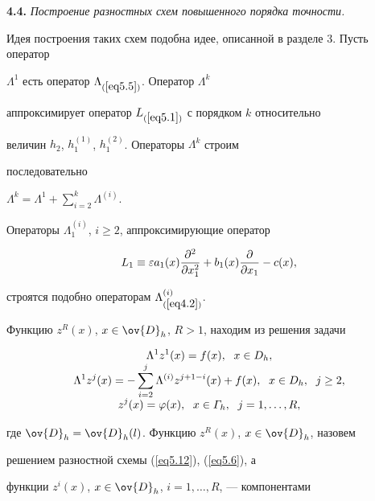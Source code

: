 {\bf 4.4.} {\it  Построение разностных схем повышенного порядка точности.}


Идея построения таких схем подобна идее, описанной в разделе 3. Пусть оператор


$\Lambda^1$ есть оператор $\Lambda_{(\ref{eq5.5})}$. Оператор $\Lambda^k$


аппроксимирует оператор $L_{(\ref{eq5.1})}$ с порядком $k$ относительно


величин $h_2$, $h_1^{(1)}$, $h_1^{(2)}$. Операторы $\Lambda^k$ строим


последовательно


$\Lambda^k=\Lambda^1+\sum\limits_{i=2}^k\Lambda^{(i)}$.


Операторы $\Lambda^{(i)}_1$, $i\ge 2$, аппроксимирующие оператор


$$


L_1\equiv \eps a_1(x)\frac{\pa^2}{\pa x_1^2} +


b_1(x)\frac{\pa}{\pa x_1}-c(x),


$$


строятся подобно операторам $\Lambda^{(i)}_{(\ref{eq4.2})}$.





Функцию $z^R(x)$, $x\in\ov{D}_h$, $R>1$, находим из решения задачи


\begin{equation}


\label{eq5.12}


\begin{array}{c}


\displaystyle\Lambda^1 z^1(x)=f(x),\ \; x\in D_h,\\


\displaystyle\Lambda^1 z^j(x)=-\sum_{i=2}^j \Lambda^{(i)}z^{j+1-i}(x)+f(x),


\ \; x\in D_h, \ \; j\ge 2,\\


\displaystyle z^j(x)=\f(x),\ \; x\in \varGamma_h,\ \; j=1,\dotsc,R,


\end{array}


\end{equation}


где $\ov{D}_h=\ov{D}_h(l)$. Функцию $z^R(x)$, $x\in\ov{D}_h$, назовем


решением разностной схемы (\ref{eq5.12}), (\ref{eq5.6}), а


функции $z^i(x)$, $x\in\ov{D}_h$, $i=1,\dotsc,R$, --- компонентами


